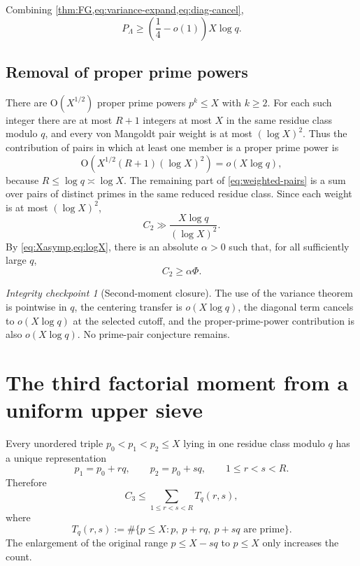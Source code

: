 \documentclass[11pt]{article}
\theoremstyle{definition}
\theoremstyle{remark}
\newtheorem{checkpoint}[theorem]{Integrity checkpoint}
\newcommand{\1}{\mathbf 1}
\newcommand{\OO}{\mathrm O}
\begin{document}
Combining \cref{thm:FG,eq:variance-expand,eq:diag-cancel},
\begin{equation}\label{eq:weighted-pairs}
 P_\Lambda\ge\left(\frac14-o(1)\right)X\log q.
\end{equation}

\subsection{Removal of proper prime powers}

There are $\OO(X^{1/2})$ proper prime powers $p^k\le X$ with $k\ge2$.
For each such integer there are at most $R+1$ integers at most $X$ in the same residue class modulo $q$, and every von Mangoldt pair weight is at most $(\log X)^2$.
Thus the contribution of pairs in which at least one member is a proper prime power is
\begin{equation}\label{eq:pp-error}
 \OO\!\left(X^{1/2}(R+1)(\log X)^2\right)
 =o(X\log q),
\end{equation}
because $R\le\log q\asymp\log X$.
The remaining part of \cref{eq:weighted-pairs} is a sum over pairs of distinct primes in the same reduced residue class.  Since each weight is at most $(\log X)^2$,
\[
 C_2\gg\frac{X\log q}{(\log X)^2}.
\]
By \cref{eq:Xasymp,eq:logX}, there is an absolute $\alpha>0$ such that, for all sufficiently large $q$,
\begin{equation}\label{eq:C2}
 \boxed{C_2\ge\alpha\Phi.}
\end{equation}

\begin{checkpoint}[Second-moment closure]
The use of the variance theorem is pointwise in $q$, the centering transfer is $o(X\log q)$, the diagonal term cancels to $o(X\log q)$ at the selected cutoff, and the proper-prime-power contribution is also $o(X\log q)$.  No prime-pair conjecture remains.
\end{checkpoint}

\section{The third factorial moment from a uniform upper sieve}\label{sec:triple}

Every unordered triple $p_0<p_1<p_2\le X$ lying in one residue class modulo $q$ has a unique representation
\[
 p_1=p_0+rq,\qquad p_2=p_0+sq,
 \qquad 1\le r<s<R.
\]
Therefore
\begin{equation}\label{eq:C3-decomp}
 C_3\le\sum_{1\le r<s<R}T_q(r,s),
\end{equation}
where
\[
 T_q(r,s):=
 \#\{p\le X:p,\ p+rq,\ p+sq\text{ are prime}\}.
\]
The enlargement of the original range $p\le X-sq$ to $p\le X$ only increases the count.
\end{document}

